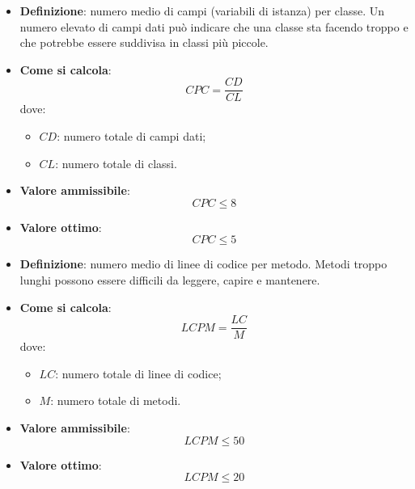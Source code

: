 \hypertarget{16M}{}
\begin{itemize}
	\item \textbf{Definizione}: numero medio di campi (variabili di istanza) per classe. Un numero elevato di campi dati può indicare che una classe sta facendo troppo e che potrebbe essere suddivisa in classi più piccole.
	\item \textbf{Come si calcola}: \begin{equation*}CPC = \frac{CD}{CL}\end{equation*} dove:
		\begin{itemize}
			\item $CD$: numero totale di campi dati;
			\item $CL$: numero totale di classi.
		\end{itemize}
	\item \textbf{Valore ammissibile}: \begin{equation*}CPC \leq 8\end{equation*}
	\item \textbf{Valore ottimo}: \begin{equation*}CPC \leq 5\end{equation*}
\end{itemize}

\hypertarget{17M}{}
\begin{itemize}
	\item \textbf{Definizione}: numero medio di linee di codice per metodo. Metodi troppo lunghi possono essere difficili da leggere, capire e mantenere.
	\item \textbf{Come si calcola}: \begin{equation*}LCPM = \frac{LC}{M}\end{equation*} dove:
		\begin{itemize}
			\item $LC$: numero totale di linee di codice;
			\item $M$: numero totale di metodi.
		\end{itemize}
	\item \textbf{Valore ammissibile}: \begin{equation*}LCPM \leq 50\end{equation*}
	\item \textbf{Valore ottimo}: \begin{equation*}LCPM \leq 20\end{equation*}
\end{itemize}

